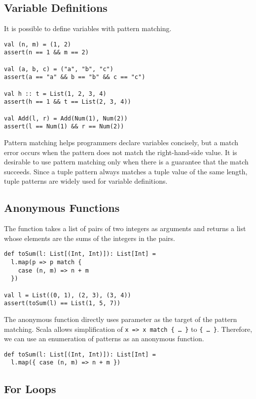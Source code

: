 \subsection{Variable Definitions}

It is possible to define variables with pattern matching.

\begin{verbatim}
val (n, m) = (1, 2)
assert(n == 1 && m == 2)

val (a, b, c) = ("a", "b", "c")
assert(a == "a" && b == "b" && c == "c")

val h :: t = List(1, 2, 3, 4)
assert(h == 1 && t == List(2, 3, 4))

val Add(l, r) = Add(Num(1), Num(2))
assert(l == Num(1) && r == Num(2))
\end{verbatim}

Pattern matching helps programmers declare variables concisely, but a match error occurs
when the pattern does not match the right-hand-side value. It is desirable to use
pattern matching only when there is a guarantee that the match succeeds. Since
a tuple pattern always matches a tuple value of the same length,
tuple patterns are widely used for variable definitions.

\subsection{Anonymous Functions}

The function  takes a list of pairs of two integers as arguments and
returns a list whose elements are the sums of the integers in the pairs.

\begin{verbatim}
def toSum(l: List[(Int, Int)]): List[Int] =
  l.map(p => p match {
    case (n, m) => n + m
  })

val l = List((0, 1), (2, 3), (3, 4))
assert(toSum(l) == List(1, 5, 7))
\end{verbatim}

The anonymous function directly uses parameter  as the target of the
pattern matching. Scala allows simplification of \verb!x => x match { … }! to
\verb!{ … }!. Therefore, we can use an enumeration of patterns as an anonymous
function.

\begin{verbatim}
def toSum(l: List[(Int, Int)]): List[Int] =
  l.map({ case (n, m) => n + m })
\end{verbatim}

\subsection{For Loops}

